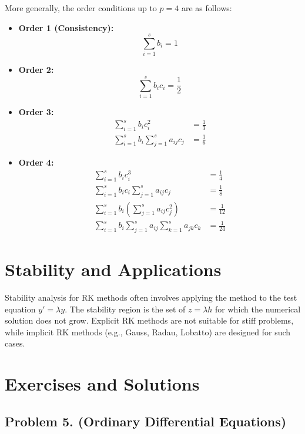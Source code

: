 More generally, the order conditions up to $p=4$ are as follows:
\begin{itemize}
  \item \textbf{Order 1 (Consistency):}
    \begin{equation}
      \sum_{i=1}^s b_i = 1
    \end{equation}
  \item \textbf{Order 2:}
    \begin{equation}
      \sum_{i=1}^s b_i c_i = \frac{1}{2}
    \end{equation}
  \item \textbf{Order 3:}
    \begin{align}
      \sum_{i=1}^s b_i c_i^2 &= \frac{1}{3} \\
      \sum_{i=1}^s b_i \sum_{j=1}^s a_{ij} c_j &= \frac{1}{6}
    \end{align}
  \item \textbf{Order 4:}
    \begin{align}
      \sum_{i=1}^s b_i c_i^3 &= \frac{1}{4} \\
      \sum_{i=1}^s b_i c_i \sum_{j=1}^s a_{ij} c_j &= \frac{1}{8} \\
      \sum_{i=1}^s b_i \left(\sum_{j=1}^s a_{ij} c_j^2\right) &= \frac{1}{12} \\
      \sum_{i=1}^s b_i \sum_{j=1}^s a_{ij} \sum_{k=1}^s a_{jk} c_k &= \frac{1}{24}
    \end{align}
\end{itemize}

\section{Stability and Applications}
\label{sec:rk:stability}
Stability analysis for RK methods often involves applying the method to the test equation $y' = \lambda y$. The stability region is the set of $z = \lambda h$ for which the numerical solution does not grow. Explicit RK methods are not suitable for stiff problems, while implicit RK methods (e.g., Gauss, Radau, Lobatto) are designed for such cases.

\section{Exercises and Solutions}

\subsection*{Problem 5. (Ordinary Differential Equations)}

